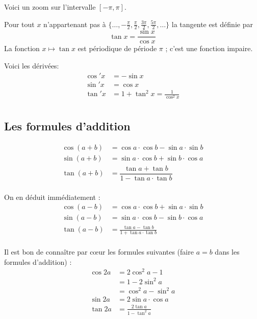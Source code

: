 \documentclass[10pt,class=article,crop=false]{standalone}
\begin{document}
\begin{multicols}{2}

Voici un zoom sur l'intervalle $[-\pi,\pi]$.


Pour tout $x$ n'appartenant pas à $\{\ldots, -\frac\pi2, \frac\pi2, \frac{3\pi}{2}, \frac{5\pi}{2},\ldots  \}$
la tangente est définie par
$$\tan x = \frac{\sin x}{\cos x}$$
La fonction $x \mapsto \tan x$ est périodique de période $\pi$ ; c'est une fonction impaire.



Voici les dérivées:
\begin{align*}
	\cos'x&= -\sin x\\
	\sin'x&=\cos x\\
	\tan' x &= 1+\tan^2x=\frac{1}{\cos^2x}\\
\end{align*}




\subsection{Les formules d'addition}



\begin{align*}
	\cos(a+b) &= \cos a \cdot \cos b - \sin a \cdot \sin b \\
	\sin(a+b) &= \sin a\cdot \cos b  +  \sin b\cdot\cos a \\
	\tan (a+b) &=\dfrac{\tan a + \tan b}{1-\tan a \cdot \tan b}\\
\end{align*}



On en déduit immédiatement :
\begin{align*}
	\cos(a-b)&=\cos a\cdot\cos b + \sin a\cdot\sin b\\
	\sin(a-b)&=\sin a\cdot\cos b  - \sin b\cdot\cos a \\
	\tan (a-b)&=\frac{\tan a - \tan b}{1+\tan a\cdot\tan b} \\
\end{align*}



Il est bon de connaître par c\oe ur les formules suivantes (faire $a=b$ dans les formules d'addition) :
\begin{align*}
	\cos 2a &= 2\cos^2a-1\\
	&= 1-2\sin^2a\\
	&=\cos^2a-\sin^2a\\
	\sin 2a &= 2\sin a\cdot \cos a\\
	\tan 2a &= \frac{2\tan a}{1-\tan^2 a}
\end{align*}


\end{multicols}
\end{document}
